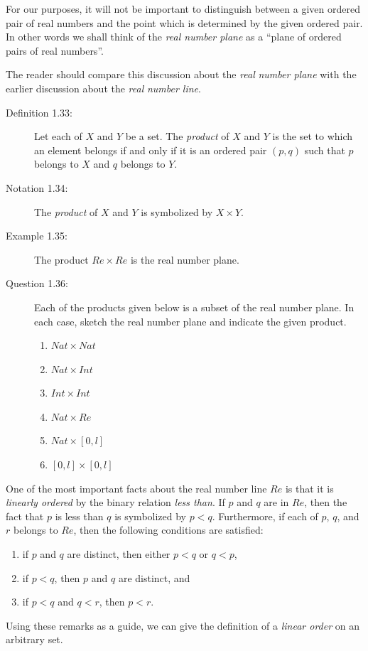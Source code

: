 \documentclass{book}
\begin{document}
For our purposes, it will not be important to distinguish between a given ordered pair of real numbers and the point which is determined by the given ordered pair. In other words we shall think of the \emph{real number plane} as a ``plane of ordered pairs of real numbers''.

The reader should compare this discussion about the \emph{real} \emph{number plane} with the earlier discussion about the \emph{real} \emph{number line}.

\begin{description}

\item[Definition 1.33:] Let each of $X$ and $Y$ be a set. The \emph{product} of $X$ and $Y$ is the set to which an element belongs if and only if it is an ordered pair $(p,q)$ such that $p$ belongs to $X$ and $q$ belongs to $Y$.

\item[Notation 1.34:] The \emph{product} of $X$ and $Y$ is symbolized by $X \times Y$.

\item[Example 1.35:] The product $Re \times Re$ is the real number plane.

\item[Question 1.36:] Each of the products given below is a subset of the real number plane. In each case, sketch the real number plane and indicate the given product.
\begin{enumerate}[\hspace{1cm}(a)]
  \item $Nat \times Nat$
  \item $Nat \times Int$
  \item $Int \times Int$ 
  \item $Nat \times Re$
  \item $Nat \times [0,l]$
  \item $[0,l] \times [0,l]$
\end{enumerate}

\end{description}

One of the most important facts about the real number line $Re$ is that it is \emph{linearly ordered} by the binary relation \emph{less than}. If $p$ and $q$ are in $Re$, then the fact that $p$ is less than $q$ is symbolized by $p < q$. Furthermore, if each of $p$, $q$, and $r$ belongs to $Re$, then the following conditions are satisfied:
\begin{enumerate}[\hspace{1cm}(a)]
  \item if $p$ and $q$ are distinct, then either $p < q$ or $q < p$,
  \item if $p < q$, then $p$ and $q$ are distinct, and
  \item if $p < q$ and $q < r$, then $p < r$.
\end{enumerate}
Using these remarks as a guide, we can give the definition of a \emph{linear order} on an arbitrary set.
\end{document}

